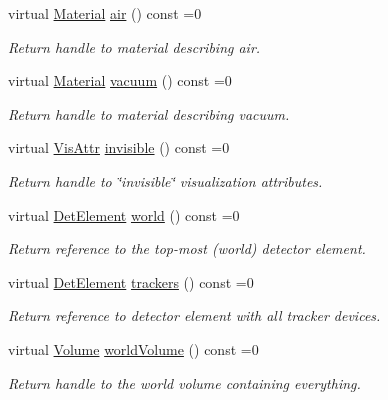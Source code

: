 \begin{DoxyCompactItemize}
virtual \hyperlink{class_d_d4hep_1_1_geometry_1_1_material}{Material} \hyperlink{class_d_d4hep_1_1_geometry_1_1_l_c_d_d_a35239d8469cba6c091e970a1baec312b}{air} () const =0
\begin{DoxyCompactList}\small\item\em Return handle to material describing air. \end{DoxyCompactList}\item 
virtual \hyperlink{class_d_d4hep_1_1_geometry_1_1_material}{Material} \hyperlink{class_d_d4hep_1_1_geometry_1_1_l_c_d_d_adf89eaa970c7c23b6896f79a6ad28b7f}{vacuum} () const =0
\begin{DoxyCompactList}\small\item\em Return handle to material describing vacuum. \end{DoxyCompactList}\item 
virtual \hyperlink{class_d_d4hep_1_1_geometry_1_1_vis_attr}{Vis\+Attr} \hyperlink{class_d_d4hep_1_1_geometry_1_1_l_c_d_d_acafee280cadae2b44117eb751e0790aa}{invisible} () const =0
\begin{DoxyCompactList}\small\item\em Return handle to \char`\"{}invisible\char`\"{} visualization attributes. \end{DoxyCompactList}\item 
virtual \hyperlink{class_d_d4hep_1_1_geometry_1_1_det_element}{Det\+Element} \hyperlink{class_d_d4hep_1_1_geometry_1_1_l_c_d_d_ae61d027023791272cf976432c0b3a977}{world} () const =0
\begin{DoxyCompactList}\small\item\em Return reference to the top-\/most (world) detector element. \end{DoxyCompactList}\item 
virtual \hyperlink{class_d_d4hep_1_1_geometry_1_1_det_element}{Det\+Element} \hyperlink{class_d_d4hep_1_1_geometry_1_1_l_c_d_d_a23b3868f3b09adccc62799612285c7db}{trackers} () const =0
\begin{DoxyCompactList}\small\item\em Return reference to detector element with all tracker devices. \end{DoxyCompactList}\item 
virtual \hyperlink{class_d_d4hep_1_1_geometry_1_1_volume}{Volume} \hyperlink{class_d_d4hep_1_1_geometry_1_1_l_c_d_d_aa7d089039516ff312cf95168288019fe}{world\+Volume} () const =0
\begin{DoxyCompactList}\small\item\em Return handle to the world volume containing everything. \end{DoxyCompactList}\item 

\end{DoxyCompactItemize}
